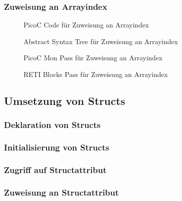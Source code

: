 \subsubsection{Zuweisung an Arrayindex}
\begin{figure}[H]
  \centering
  \caption{PicoC Code für Zuweisung an Arrayindex}
  \label{fig:picoc_code_für_array_assignment}
\end{figure}

\begin{figure}[H]
  \centering
  \caption{Abstract Syntax Tree für Zuweisung an Arrayindex}
  \label{fig:abstract_syntax_tree_für_array_assignment}
\end{figure}

\begin{figure}[H]
  \centering
  \caption{PicoC Mon Pass für Zuweisung an Arrayindex}
  \label{fig:picoc_mon_für_array_assignment}
\end{figure}

\begin{figure}[H]
  \centering
  \caption{RETI Blocks Pass für Zuweisung an Arrayindex}
  \label{fig:reti_blocks_für_array_assignment}
\end{figure}

\subsection{Umsetzung von Structs}
\subsubsection{Deklaration von Structs}
\subsubsection{Initialisierung von Structs}
\subsubsection{Zugriff auf Structattribut}
\subsubsection{Zuweisung an Structattribut}

